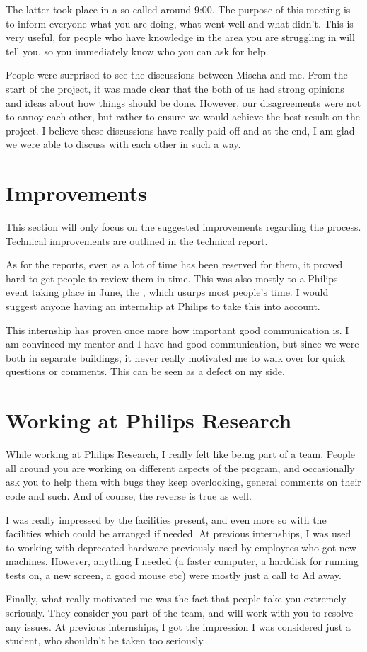 The latter took place in a so-called  around 9:00. The purpose of this meeting is to inform everyone what you are doing, what went well and what didn't. This is very useful, for people who have knowledge in the area you are struggling in will tell you, so you immediately know who you can ask for help.

People were surprised to see the discussions between Mischa and me. From the start of the project, it was made clear that the both of us had strong opinions and ideas about how things should be done. However, our disagreements were not to annoy each other, but rather to ensure we would achieve the best result on the project. I believe these discussions have really paid off and at the end, I am glad we were able to discuss with each other in such a way.

\section{Improvements}

This section will only focus on the suggested improvements regarding the process. Technical improvements are outlined in the technical report.

As for the reports, even as a lot of time has been reserved for them, it proved hard to get people to review them in time. This was also mostly to a Philips event taking place in June, the , which usurps most people's time. I would suggest anyone having an internship at Philips to take this into account.

This internship has proven once more how important good communication is. I am convinced my mentor and I have had good communication, but since we were both in separate buildings, it never really motivated me to walk over for quick questions or comments. This can be seen as a defect on my side.

\section{Working at Philips Research}

While working at Philips Research, I really felt like being part of a team. People all around you are working on different aspects of the program, and occasionally ask you to help them with bugs they keep overlooking, general comments on their code and such. And of course, the reverse is true as well.

I was really impressed by the facilities present, and even more so with the facilities which could be arranged if needed. At previous internships, I was used to working with deprecated hardware previously used by employees who got new machines. However, anything I needed (a faster computer, a harddisk for running tests on, a new screen, a good mouse etc) were mostly just a call to Ad away.

Finally, what really motivated me was the fact that people take you extremely seriously. They consider you part of the team, and will work with you to resolve any issues. At previous internships, I got the impression I was considered just a student, who shouldn't be taken too seriously.
